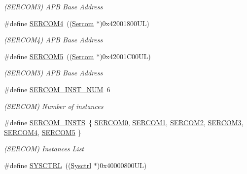 \begin{DoxyCompactItemize}
\begin{DoxyCompactList}\small\item\em (S\+E\+R\+C\+O\+M3) A\+PB Base Address \end{DoxyCompactList}\item 
\#define \mbox{\hyperlink{group___s_a_m_d21_g15_l__base_gad48343faa88820b8f552aa1eaf66f00a}{S\+E\+R\+C\+O\+M4}}~((\mbox{\hyperlink{union_sercom}{Sercom}}   $\ast$)0x42001800\+U\+L)
\begin{DoxyCompactList}\small\item\em (S\+E\+R\+C\+O\+M4) A\+PB Base Address \end{DoxyCompactList}\item 
\#define \mbox{\hyperlink{group___s_a_m_d21_g15_l__base_ga8785a316e608cb0a218f2a59655d6037}{S\+E\+R\+C\+O\+M5}}~((\mbox{\hyperlink{union_sercom}{Sercom}}   $\ast$)0x42001\+C00\+U\+L)
\begin{DoxyCompactList}\small\item\em (S\+E\+R\+C\+O\+M5) A\+PB Base Address \end{DoxyCompactList}\item 
\#define \mbox{\hyperlink{group___s_a_m_d21_g15_l__base_ga75f7d8cff25db3f1353efb6f7990fce5}{S\+E\+R\+C\+O\+M\+\_\+\+I\+N\+S\+T\+\_\+\+N\+UM}}~6
\begin{DoxyCompactList}\small\item\em (S\+E\+R\+C\+OM) Number of instances \end{DoxyCompactList}\item 
\#define \mbox{\hyperlink{group___s_a_m_d21_g15_l__base_gadb03dbe1ef2a3400f0a16b58948053a7}{S\+E\+R\+C\+O\+M\+\_\+\+I\+N\+S\+TS}}~\{ \mbox{\hyperlink{group___s_a_m_d21_j18_a__base_gae5473788457bad0e69ad9d7f22ed404f}{S\+E\+R\+C\+O\+M0}}, \mbox{\hyperlink{group___s_a_m_d21_j18_a__base_ga130d7d7bc9ef1da1ba1bd094b42449d7}{S\+E\+R\+C\+O\+M1}}, \mbox{\hyperlink{group___s_a_m_d21_j18_a__base_ga918e4c85993961a115bb23b4bb73a87f}{S\+E\+R\+C\+O\+M2}}, \mbox{\hyperlink{group___s_a_m_d21_j18_a__base_gac9f8240be5a40b46cb09617323ebc7e3}{S\+E\+R\+C\+O\+M3}}, \mbox{\hyperlink{group___s_a_m_d21_j18_a__base_gad48343faa88820b8f552aa1eaf66f00a}{S\+E\+R\+C\+O\+M4}}, \mbox{\hyperlink{group___s_a_m_d21_j18_a__base_ga8785a316e608cb0a218f2a59655d6037}{S\+E\+R\+C\+O\+M5}} \}
\begin{DoxyCompactList}\small\item\em (S\+E\+R\+C\+OM) Instances List \end{DoxyCompactList}\item 
\#define \mbox{\hyperlink{group___s_a_m_d21_g15_l__base_gaf94c5196d5506d0a34a0938d9bdb480f}{S\+Y\+S\+C\+T\+RL}}~((\mbox{\hyperlink{struct_sysctrl}{Sysctrl}}  $\ast$)0x40000800\+U\+L)

\end{DoxyCompactItemize}
